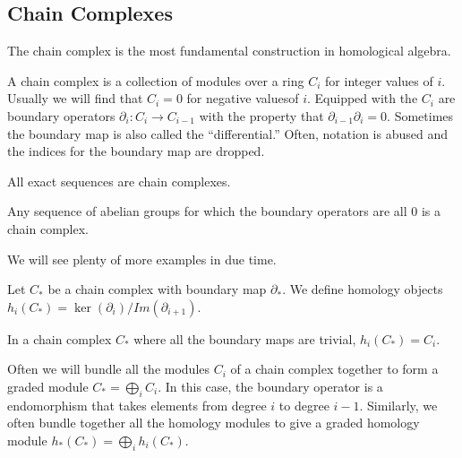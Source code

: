\subsection{Chain Complexes}
The chain complex is the most fundamental construction in homological algebra.
\begin{definition} A chain complex is a collection of modules over a ring $C_i$
for integer values of $i$. Usually we will find that $C_i=0$ for negative valuesof $i$. Equipped with the $C_i$ are boundary operators
$\partial_i:C_i\rightarrow C_{i-1}$ with the property that
$\partial_{i-1}\partial_i=0$. Sometimes the boundary map is also called the
``differential.'' Often, notation is abused and the indices for the boundary map are dropped.\end{definition}
\begin{example} All exact sequences are chain complexes. \end{example}
\begin{example} Any sequence of abelian groups for which the boundary operators
are all $0$ is a chain complex. \end{example}
We will see plenty of more examples in due time. 
\begin{definition} Let $C_*$ be a chain complex with boundary map $\partial_*$.
We define homology objects $h_i(C_*)=\ker(\partial_i)/Im(\partial_{i+1})$.
\end{definition}
\begin{example} In a chain complex $C_*$ where all the boundary maps are
trivial, $h_i(C_*)=C_i$. \end{example}

Often we will bundle all the modules $C_i$ of a chain complex together to form a graded module $C_*=\bigoplus_i C_i$. In this case, the boundary operator is a
endomorphism that takes elements from degree $i$ to degree $i-1$. Similarly, we
often bundle together all the homology modules to give a graded homology module
$h_*(C_*)=\bigoplus_i h_i(C_*)$.

